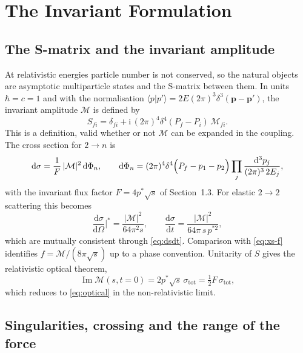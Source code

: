 \documentclass[11pt,a4paper]{book}
\numberwithin{equation}{chapter}
\newcommand{\dd}{\mathrm{d}}
\newcommand{\ii}{\mathrm{i}}
\newcommand{\Imag}{\operatorname{Im}}
\newcommand{\dsdO}{\frac{\dd\sigma}{\dd\Omega}}
\begin{document}
\chapter{The Invariant Formulation}

\section{The S-matrix and the invariant amplitude}

At relativistic energies particle number is not conserved, so the natural
objects are asymptotic multiparticle states and the S-matrix between them. In
units $\hbar=c=1$ and with the normalisation
$\langle p|p'\rangle=2E(2\pi)^3\delta^3(\bm p-\bm p')$, the invariant amplitude
$\mathcal M$ is defined by
\begin{equation}\label{eq:Smat}
  S_{fi}=\delta_{fi}+\ii\,(2\pi)^4\delta^4(P_f-P_i)\,\mathcal M_{fi}.
\end{equation}
This is a definition, valid whether or not $\mathcal M$ can be expanded in the
coupling. The cross section for $2\to n$ is
\begin{equation}\label{eq:dsigma}
  \dd\sigma=\frac1F\,|\mathcal M|^2\,\dd\Phi_n,\qquad
  \dd\Phi_n=(2\pi)^4\delta^4\Bigl(P_f-p_1-p_2\Bigr)\prod_{j}
  \frac{\dd^3p_j}{(2\pi)^3\,2E_j},
\end{equation}
with the invariant flux factor $F=4p^*\sqrt s$ of Section~1.3. For elastic
$2\to2$ scattering this becomes
\begin{equation}\label{eq:dsdOm-M}
  \dsdO\Big|^*=\frac{|\mathcal M|^2}{64\pi^2s},\qquad
  \frac{\dd\sigma}{\dd t}=\frac{|\mathcal M|^2}{64\pi\,s\,p^{*2}},
\end{equation}
which are mutually consistent through \eqref{eq:dsdt}. Comparison with
\eqref{eq:xs-f} identifies $f=\mathcal M/(8\pi\sqrt s)$ up to a phase convention.
Unitarity of $S$ gives the relativistic optical theorem,
\begin{equation}\label{eq:opt-rel}
  \Imag\mathcal M(s,t=0)=2p^*\sqrt s\,\sigma_{\mathrm{tot}}=\tfrac12F\,\sigma_{\mathrm{tot}},
\end{equation}
which reduces to \eqref{eq:optical} in the non-relativistic limit.

\section{Singularities, crossing and the range of the force}
\end{document}
